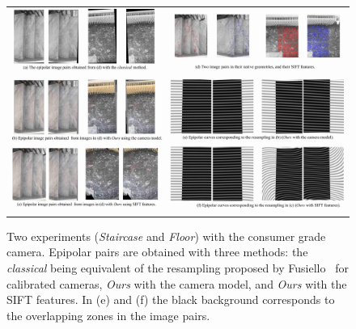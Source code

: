 \documentclass{ipol}
\begin{document}
    
    


\begin{figure}%
\centering
\begin{tabular}{c}
\includegraphics[width=\textwidth]{FIGS/floor_stairs_epi.jpg}
\end{tabular}
\caption{Two experiments (\textit{Staircase} and \textit{Floor}) with the consumer grade camera. Epipolar pairs are obtained with three methods: the \textit{classical} being equivalent of the resampling proposed by Fusiello~\cite{fusiello2000epi} for calibrated cameras, \textit{Ours} with the camera model, and \textit{Ours} with the SIFT features. In (e) and (f) the black background corresponds to the overlapping zones in the image pairs.}
 
\label{ExpConsumerCam}
\end{figure}

 




\end{document}
